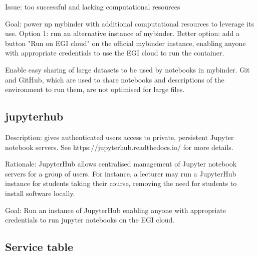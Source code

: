 Issue: too successful and lacking computational resources

Goal: power up mybinder with additional computational resources to
leverage its use. Option 1: run an alternative instance of mybinder.
Better option: add a button "Run on EGI cloud" on the official
mybinder instance, enabling anyone with appropriate credentials to use
the EGI cloud to run the container.

Enable easy sharing of large datasets to be used by notebooks in mybinder. Git
and GitHub, which are used to share notebooks and descriptions of the
environment to run them, are not optimised for large files.

\subsection{jupyterhub}

Description: gives authenticated users access to private, persistent Jupyter
notebook servers. See https://jupyterhub.readthedocs.io/ for more details.

Rationale: JupyterHub allows centralised management of Jupyter notebook servers
for a group of users. For instance, a lecturer may run a JupyterHub instance for
students taking their course, removing the need for students to install software
locally.

Goal: Run an instance of JupyterHub enabling anyone with appropriate
credentials to run jupyter notebooks on the EGI cloud.

\subsection{Service table}


